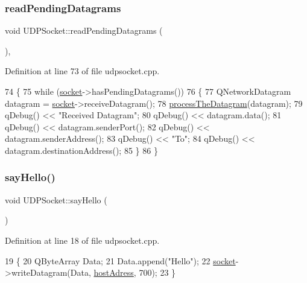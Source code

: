 \subsubsection{\texorpdfstring{read\+Pending\+Datagrams}{readPendingDatagrams}}
{\footnotesize\ttfamily void U\+D\+P\+Socket\+::read\+Pending\+Datagrams (\begin{DoxyParamCaption}{ }\end{DoxyParamCaption})\hspace{0.3cm}{\ttfamily [private]}, {\ttfamily [slot]}}



Definition at line 73 of file udpsocket.\+cpp.


\begin{DoxyCode}
74 \{
75     \textcolor{keywordflow}{while} (\hyperlink{class_u_d_p_socket_a9d27cb09deee765dfec056cfc774c878}{socket}->hasPendingDatagrams())
76     \{
77         QNetworkDatagram datagram = \hyperlink{class_u_d_p_socket_a9d27cb09deee765dfec056cfc774c878}{socket}->receiveDatagram();
78         \hyperlink{class_u_d_p_socket_ad84c799182b7d7edafe956674ecb3faf}{processTheDatagram}(datagram);
79         qDebug() << \textcolor{stringliteral}{"Received Datagram"};
80         qDebug() << datagram.data();
81         qDebug() << datagram.senderPort();
82         qDebug() << datagram.senderAddress();
83         qDebug() << \textcolor{stringliteral}{"To"};
84         qDebug() << datagram.destinationAddress();
85     \}
86 \}
\end{DoxyCode}
\mbox{\label{class_u_d_p_socket_a991e20366ed560c24402d7a6404daea7}} 
\subsubsection{\texorpdfstring{say\+Hello()}{sayHello()}}
{\footnotesize\ttfamily void U\+D\+P\+Socket\+::say\+Hello (\begin{DoxyParamCaption}{ }\end{DoxyParamCaption})}



Definition at line 18 of file udpsocket.\+cpp.


\begin{DoxyCode}
19 \{
20     QByteArray Data;
21     Data.append(\textcolor{stringliteral}{"Hello"});
22     \hyperlink{class_u_d_p_socket_a9d27cb09deee765dfec056cfc774c878}{socket}->writeDatagram(Data, \hyperlink{class_u_d_p_socket_aacd808913633488ab008e8aa7ff8d9cf}{hostAdress}, 700);
23 \}
\end{DoxyCode}
\mbox{\label{class_u_d_p_socket_a66a6c4663cc3084cb4d76583e8039083}} 
